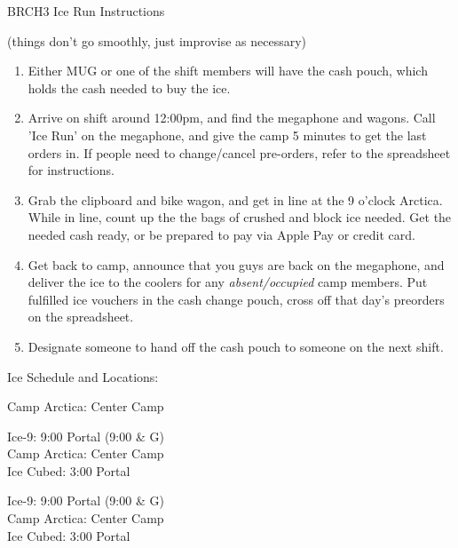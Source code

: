 \documentclass[letterpaper]{letter}
\begin{document}
\large

\begin{center}
\Huge
BRCH3 Ice Run Instructions
\end{center}

\hspace{1cm}
\begin{center}
(things don't go smoothly, just improvise as necessary)
\end{center}
\hspace{1cm}

\begin{enumerate}
  \item Either MUG or one of the shift members will have the cash pouch, which holds the cash needed to buy the ice.
  \item Arrive on shift around 12:00pm, and find the megaphone and wagons. Call 'Ice Run' on the megaphone, and give the camp 5 minutes to get the last orders in. If people need to change/cancel pre-orders, refer to the spreadsheet for instructions.
  \item Grab the clipboard and bike wagon, and get in line at the 9 o'clock Arctica. While in line, count up the the bags of crushed and block ice needed. Get the needed cash ready, or be prepared to pay via Apple Pay or credit card.
  \item Get back to camp, announce that you guys are back on the megaphone, and deliver the ice to the coolers for any \emph{absent/occupied} camp members. Put fulfilled ice vouchers in the cash change pouch, cross off that day's preorders on the spreadsheet.
  \item Designate someone to hand off the cash pouch to someone on the next shift.
\end{enumerate}

\hspace{1cm}
\begin{center}
Ice Schedule and Locations:
\begin{description}[labelsep=2em, align=left]
  \item[Early entry (Thursday - Sunday 12-6pm)] Camp Arctica: Center Camp
  \item[] 
  \item[Burn week (Monday - Sunday 9am-6pm)] Ice-9: 9:00 Portal (9:00 \& G)\\\hspace*{220pt}   Camp Arctica: Center Camp\\\hspace*{220pt} Ice Cubed: 3:00 Portal
  \item[] 
  \item[Labor Day (Monday 9am-12pm)] \hspace*{48pt}Ice-9: 9:00 Portal (9:00 \& G)\\\hspace*{220pt} Camp Arctica: Center Camp\\\hspace*{220pt} Ice Cubed: 3:00 Portal
\end{description}
\end{center}
\end{document}
